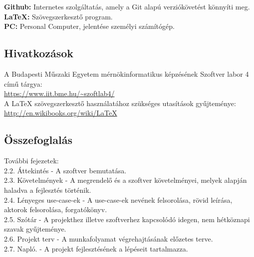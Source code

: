 \noindent\textbf{Github:} Internetes szolgáltatás, amely a Git alapú verziókövetést könnyíti meg.\\

\noindent\textbf{LaTeX:} Szövegszerkesztő program.\\

\noindent\textbf{PC:} Personal Computer, jelentése személyi számítógép.


\subsection{Hivatkozások}

A Budapesti Műszaki Egyetem mérnökinformatikus képzésének Szoftver labor 4 című tárgya:  \\
\url{https://www.iit.bme.hu/~szoftlab4/}\\

A LaTeX szövegszerkesztő használatához szükséges utasítások gyűjteménye:\\
\url{http://en.wikibooks.org/wiki/LaTeX}\\


\subsection{Összefoglalás}

 További fejezetek:\\

 2.2. Áttekintés - A szoftver bemutatása.\\

 2.3. Követelmények - A megrendelő és a szoftver követelményei, melyek alapján haladva a fejlesztés történik.\\

 2.4. Lényeges use-case-ek - A use-case-ek nevének felsorolása, rövid leírása, aktorok felsorolása, forgatókönyv.\\

 2.5. Szótár - A projekthez illetve szoftverhez kapcsolódó idegen, nem hétköznapi szavak gyűjteménye.\\

 2.6. Projekt terv - A munkafolyamat végrehajtásának előzetes terve.\\

 2.7. Napló. - A projekt fejlesztésének a lépéseit tartalmazza.
